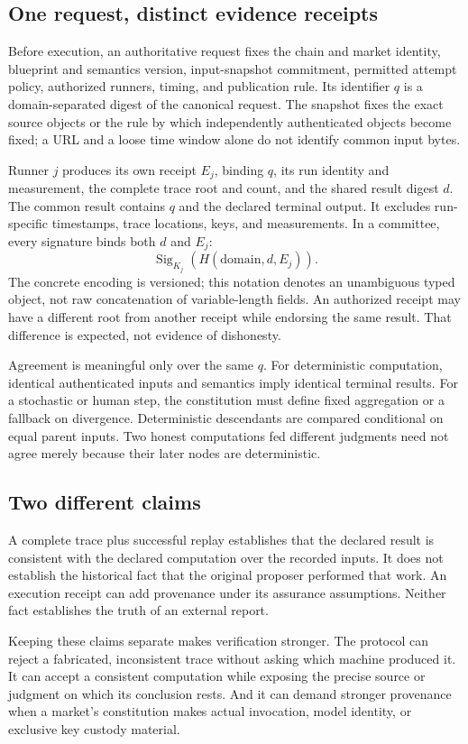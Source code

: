 \subsection{One request, distinct evidence receipts}

Before execution, an authoritative request fixes the chain and market identity, blueprint and semantics version, input-snapshot commitment, permitted attempt policy, authorized runners, timing, and publication rule. Its identifier $q$ is a domain-separated digest of the canonical request. The snapshot fixes the exact source objects or the rule by which independently authenticated objects become fixed; a URL and a loose time window alone do not identify common input bytes.

Runner $j$ produces its own receipt $E_j$, binding $q$, its run identity and measurement, the complete trace root and count, and the shared result digest $d$. The common result contains $q$ and the declared terminal output. It excludes run-specific timestamps, trace locations, keys, and measurements. In a committee, every signature binds both $d$ and $E_j$:
\[
\operatorname{Sig}_{K_j}\!\left(H(\mathrm{domain},d,E_j)\right).
\]
The concrete encoding is versioned; this notation denotes an unambiguous typed object, not raw concatenation of variable-length fields. An authorized receipt may have a different root from another receipt while endorsing the same result. That difference is expected, not evidence of dishonesty.

Agreement is meaningful only over the same $q$. For deterministic computation, identical authenticated inputs and semantics imply identical terminal results. For a stochastic or human step, the constitution must define fixed aggregation or a fallback on divergence. Deterministic descendants are compared conditional on equal parent inputs. Two honest computations fed different judgments need not agree merely because their later nodes are deterministic.

\subsection{Two different claims}

A complete trace plus successful replay establishes that the declared result is consistent with the declared computation over the recorded inputs. It does not establish the historical fact that the original proposer performed that work. An execution receipt can add provenance under its assurance assumptions. Neither fact establishes the truth of an external report.

Keeping these claims separate makes verification stronger. The protocol can reject a fabricated, inconsistent trace without asking which machine produced it. It can accept a consistent computation while exposing the precise source or judgment on which its conclusion rests. And it can demand stronger provenance when a market's constitution makes actual invocation, model identity, or exclusive key custody material.
